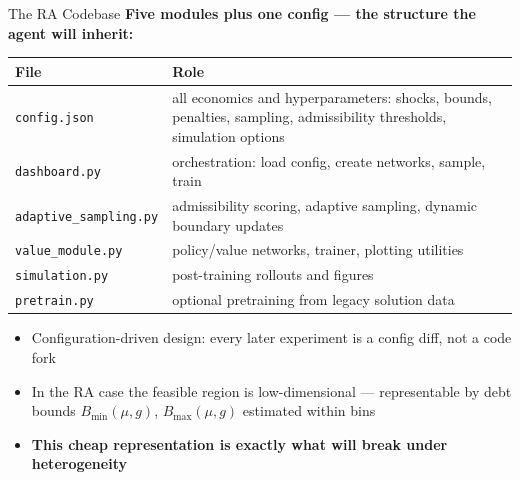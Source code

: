 \documentclass[10pt,aspectratio=169]{beamer}
\newcommand{\compacttables}{\renewcommand{\arraystretch}{1.15}}
\begin{document}
\begin{frame}{The RA Codebase}
\textbf{Five modules plus one config --- the structure the agent will inherit:}

\smallskip
\compacttables
\begin{center}\footnotesize
\begin{tabular}{p{3.6cm}p{8.3cm}}
\toprule
\textbf{File} & \textbf{Role} \\
\midrule
\texttt{config.json} & all economics and hyperparameters: shocks, bounds, penalties, sampling, admissibility thresholds, simulation options \\
\texttt{dashboard.py} & orchestration: load config, create networks, sample, train \\
\texttt{adaptive\_sampling.py} & admissibility scoring, adaptive sampling, dynamic boundary updates \\
\texttt{value\_module.py} & policy/value networks, trainer, plotting utilities \\
\texttt{simulation.py} & post-training rollouts and figures \\
\texttt{pretrain.py} & optional pretraining from legacy solution data \\
\bottomrule
\end{tabular}
\end{center}

\smallskip
\begin{itemize}\small
    \item Configuration-driven design: every later experiment is a config diff, not a code fork
    \item In the RA case the feasible region is low-dimensional --- representable by debt bounds
          $B_{\min}(\mu,g)$, $B_{\max}(\mu,g)$ estimated within bins
    \item \textbf{This cheap representation is exactly what will break under heterogeneity}
\end{itemize}
\end{frame}
\end{document}
